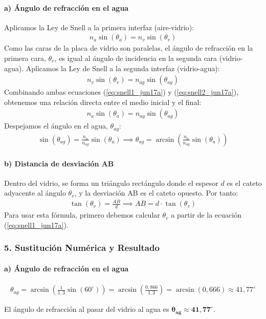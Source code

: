 \paragraph{a) Ángulo de refracción en el agua}
Aplicamos la Ley de Snell a la primera interfaz (aire-vidrio):
\begin{gather}
    n_a \sin(\theta_a) = n_v \sin(\theta_v) \label{eq:snell1_jun17a}
\end{gather}
Como las caras de la placa de vidrio son paralelas, el ángulo de refracción en la primera cara, $\theta_v$, es igual al ángulo de incidencia en la segunda cara (vidrio-agua).
Aplicamos la Ley de Snell a la segunda interfaz (vidrio-agua):
\begin{gather}
    n_v \sin(\theta_v) = n_{ag} \sin(\theta_{ag}) \label{eq:snell2_jun17a}
\end{gather}
Combinando ambas ecuaciones (\ref{eq:snell1_jun17a}) y (\ref{eq:snell2_jun17a}), obtenemos una relación directa entre el medio inicial y el final:
\begin{gather}
    n_a \sin(\theta_a) = n_{ag} \sin(\theta_{ag})
\end{gather}
Despejamos el ángulo en el agua, $\theta_{ag}$:
\begin{gather}
    \sin(\theta_{ag}) = \frac{n_a}{n_{ag}} \sin(\theta_a) \implies \theta_{ag} = \arcsin\left(\frac{n_a}{n_{ag}} \sin(\theta_a)\right)
\end{gather}

\paragraph{b) Distancia de desviación AB}
Dentro del vidrio, se forma un triángulo rectángulo donde el espesor $d$ es el cateto adyacente al ángulo $\theta_v$, y la desviación AB es el cateto opuesto. Por tanto:
\begin{gather}
    \tan(\theta_v) = \frac{AB}{d} \implies AB = d \cdot \tan(\theta_v)
\end{gather}
Para usar esta fórmula, primero debemos calcular $\theta_v$ a partir de la ecuación (\ref{eq:snell1_jun17a}).

\subsubsection*{5. Sustitución Numérica y Resultado}
\paragraph{a) Ángulo de refracción en el agua}
\begin{gather}
    \theta_{ag} = \arcsin\left(\frac{1}{1,3} \sin(60^\circ)\right) = \arcsin\left(\frac{0,866}{1,3}\right) = \arcsin(0,666) \approx 41,77^\circ
\end{gather}
\begin{cajaresultado}
El ángulo de refracción al pasar del vidrio al agua es $\boldsymbol{\theta_{ag} \approx 41,77^\circ}$.
\end{cajaresultado}

